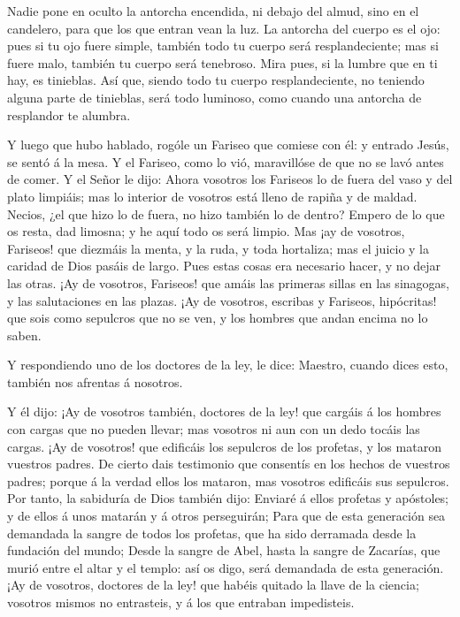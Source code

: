  Nadie pone en oculto la antorcha encendida, ni debajo del
almud, sino en el candelero, para que los que entran vean la luz.
 La antorcha del cuerpo es el ojo: pues si tu ojo fuere
simple, también todo tu cuerpo será resplandeciente; mas si fuere malo,
también tu cuerpo será tenebroso.  Mira pues, si la lumbre
que en ti hay, es tinieblas.  Así que, siendo todo tu
cuerpo resplandeciente, no teniendo alguna parte de tinieblas, será todo
luminoso, como cuando una antorcha de resplandor te alumbra.

 Y luego que hubo hablado, rogóle un Fariseo que comiese
con él: y entrado Jesús, se sentó á la mesa.  Y el Fariseo,
como lo vió, maravillóse de que no se lavó antes de comer. 
Y el Señor le dijo: Ahora vosotros los Fariseos lo de fuera del vaso y
del plato limpiáis; mas lo interior de vosotros está lleno de rapiña y
de maldad.  Necios, ¿el que hizo lo de fuera, no hizo
también lo de dentro?  Empero de lo que os resta, dad
limosna; y he aquí todo os será limpio.  Mas ¡ay de
vosotros, Fariseos! que diezmáis la menta, y la ruda, y toda hortaliza;
mas el juicio y la caridad de Dios pasáis de largo. Pues estas cosas era
necesario hacer, y no dejar las otras.  ¡Ay de vosotros,
Fariseos! que amáis las primeras sillas en las sinagogas, y las
salutaciones en las plazas.  ¡Ay de vosotros, escribas y
Fariseos, hipócritas! que sois como sepulcros que no se ven, y los
hombres que andan encima no lo saben.

 Y respondiendo uno de los doctores de la ley, le dice:
Maestro, cuando dices esto, también nos afrentas á nosotros.

 Y él dijo: ¡Ay de vosotros también, doctores de la ley!
que cargáis á los hombres con cargas que no pueden llevar; mas vosotros
ni aun con un dedo tocáis las cargas.  ¡Ay de vosotros! que
edificáis los sepulcros de los profetas, y los mataron vuestros padres.
 De cierto dais testimonio que consentís en los hechos de
vuestros padres; porque á la verdad ellos los mataron, mas vosotros
edificáis sus sepulcros.  Por tanto, la sabiduría de Dios
también dijo: Enviaré á ellos profetas y apóstoles; y de ellos á unos
matarán y á otros perseguirán;  Para que de esta generación
sea demandada la sangre de todos los profetas, que ha sido derramada
desde la fundación del mundo;  Desde la sangre de Abel,
hasta la sangre de Zacarías, que murió entre el altar y el templo: así
os digo, será demandada de esta generación.  ¡Ay de
vosotros, doctores de la ley! que habéis quitado la llave de la ciencia;
vosotros mismos no entrasteis, y á los que entraban impedisteis.

